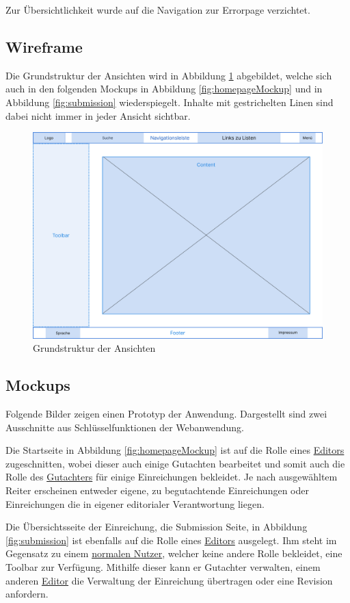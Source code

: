 Zur Übersichtlichkeit wurde auf die Navigation zur Errorpage verzichtet.

\subsection{Wireframe}

Die Grundstruktur der Ansichten wird in Abbildung \ref{fig:wireframe} abgebildet, welche sich auch in den folgenden Mockups in Abbildung \ref{fig:homepageMockup} und in Abbildung \ref{fig:submission} wiederspiegelt.
Inhalte mit gestrichelten Linen sind dabei nicht immer in jeder Ansicht sichtbar.

\begin{figure}[H]
	\centering
	\includegraphics[width=0.85\linewidth]{graphics/Wireframe-png}
	\caption{Grundstruktur der Ansichten}
	\label{fig:wireframe}
\end{figure}

\subsection{Mockups}

Folgende Bilder zeigen einen Prototyp der Anwendung.
Dargestellt sind zwei Ausschnitte aus Schlüsselfunktionen der Webanwendung.

Die Startseite in Abbildung \ref{fig:homepageMockup} ist auf die Rolle eines \hyperref[mkrit:editor]{Editors} zugeschnitten, wobei dieser auch einige
Gutachten bearbeitet und somit auch die Rolle des \hyperref[mkrit:gutachter]{Gutachters} für einige Einreichungen bekleidet.
Je nach ausgewähltem Reiter erscheinen entweder eigene, zu begutachtende Einreichungen oder Einreichungen die in eigener editorialer Verantwortung liegen.

Die Übersichtsseite der Einreichung, die Submission Seite, in Abbildung \ref{fig:submission} ist ebenfalls auf die Rolle eines \hyperref[mkrit:editor]{Editors} ausgelegt.
Ihm steht im Gegensatz zu einem \hyperref[mkrit:angemeldet]{normalen Nutzer}, welcher keine andere Rolle bekleidet, eine Toolbar zur Verfügung.
Mithilfe dieser kann er Gutachter verwalten, einem anderen \hyperref[mkrit:editor]{Editor} die Verwaltung der Einreichung übertragen oder eine Revision anfordern.


